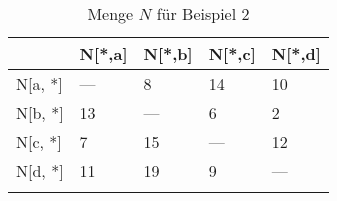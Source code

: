 
\begin{longtable}[c]{|l|l|l|l|l|}
\hline
            & N{[}*,a{]} & N{[}*,b{]} & N{[}*,c{]} & N{[}*,d{]} \\ \hline
\endfirsthead
%
\endhead
%
N{[}a, *{]} & ---        & 8          & 14         & 10         \\ \hline
N{[}b, *{]} & 13         & ---        & 6          & 2          \\ \hline
N{[}c, *{]} & 7          & 15         & ---        & 12         \\ \hline
N{[}d, *{]} & 11         & 19         & 9          & ---        \\ \hline
\caption{Menge $N$ für Beispiel 2}
\label{beispiel2N}\\
\end{longtable}